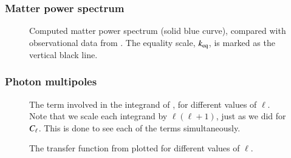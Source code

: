 \subsubsection{Matter power spectrum} \label{sssec:M4:results:matter_power_spectrum}
\begin{figure}[ht!]
    \caption{Computed matter power spectrum (solid blue curve), compared with observational data from . The equality scale, $k_\mathrm{eq}$, is marked as the vertical black line.}
    \label{fig:M4:results:matterPS_nk1000}
\end{figure}




\subsubsection{Photon multipoles} \label{sssec:M4:results:photons_multipoles}
\begin{figure}[ht!]
    \caption{The term involved in the integrand of , for different values of $\ell$. Note that we scale each integrand by $\ell(\ell+1)$, just as we did for $C_\ell$. This is done to see each of the terms simultaneously.}
    \label{fig:M4:results:integrand_thetas}
\end{figure}


\begin{figure}[ht!]
    \caption{The transfer function from  plotted for different values of $\ell$.}
    \label{fig:M4:results:thetas}
\end{figure}